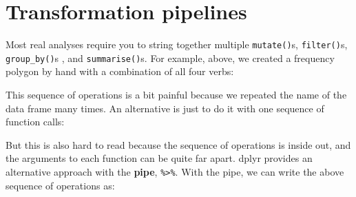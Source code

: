 \section{Transformation pipelines}\label{transformation-pipelines}

Most real analyses require you to string together multiple
\texttt{mutate()}s, \texttt{filter()}s, \texttt{group\_by()}s , and
\texttt{summarise()}s. For example, above, we created a frequency
polygon by hand with a combination of all four verbs: \indexc{\%>\%}

\begin{Shaded}
\begin{Highlighting}[]
\StringTok{ }
\StringTok{ } \NormalTok{())}
\StringTok{ }\StringTok{ }\StringTok{ }\NormalTok{)}
\StringTok{ } \StringTok{ }
\end{Highlighting}
\end{Shaded}

This sequence of operations is a bit painful because we repeated the
name of the data frame many times. An alternative is just to do it with
one sequence of function calls:

\begin{Shaded}
\begin{Highlighting}[]
\NormalTok{(}
  \NormalTok{(}
    \NormalTok{(}
      \NormalTok{(}
      \NormalTok{), }
       \NormalTok{()}
    \NormalTok{), }
    \StringTok{ }\NormalTok{, }
    \StringTok{ }
  \NormalTok{), }
   \StringTok{ }
\NormalTok{)}
\end{Highlighting}
\end{Shaded}

But this is also hard to read because the sequence of operations is
inside out, and the arguments to each function can be quite far apart.
dplyr provides an alternative approach with the \textbf{pipe},
\texttt{\%\textgreater{}\%}. With the pipe, we can write the above
sequence of operations as:

